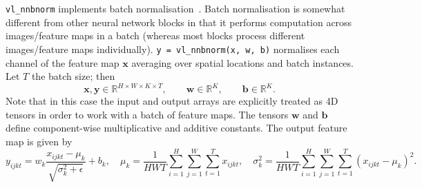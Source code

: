 \documentclass[12pt]{article}
\begin{document}
\verb!vl_nnbnorm! implements batch normalisation~\cite{ioffe2015}. Batch normalisation is somewhat different from other neural network blocks in that it performs computation across images/feature maps in a batch (whereas most blocks process different images/feature maps individually). \verb!y = vl_nnbnorm(x, w, b)! normalises each channel of the feature map $\mathbf{x}$ averaging over spatial locations and batch instances. Let $T$ the batch size; then
\[
\mathbf{x}, \mathbf{y} \in \mathbb{R}^{H \times W \times K \times T},
\qquad\mathbf{w} \in \mathbb{R}^{K},
\qquad\mathbf{b} \in \mathbb{R}^{K}.
\]
Note that in this case the input and output arrays are explicitly treated as 4D tensors in order to work with a batch of feature maps. The tensors  $\mathbf{w}$ and $\mathbf{b}$ define component-wise multiplicative and additive constants. The output feature map is given by
\[
y_{ijkt} = w_k \frac{x_{ijkt} - \mu_{k}}{\sqrt{\sigma_k^2 + \epsilon}} + b_k,
\quad
\mu_{k} = \frac{1}{HWT}\sum_{i=1}^H \sum_{j=1}^W \sum_{t=1}^{T} x_{ijkt},
\quad
\sigma^2_{k} = \frac{1}{HWT}\sum_{i=1}^H \sum_{j=1}^W \sum_{t=1}^{T} (x_{ijkt} - \mu_{k})^2.
\]
\end{document}
